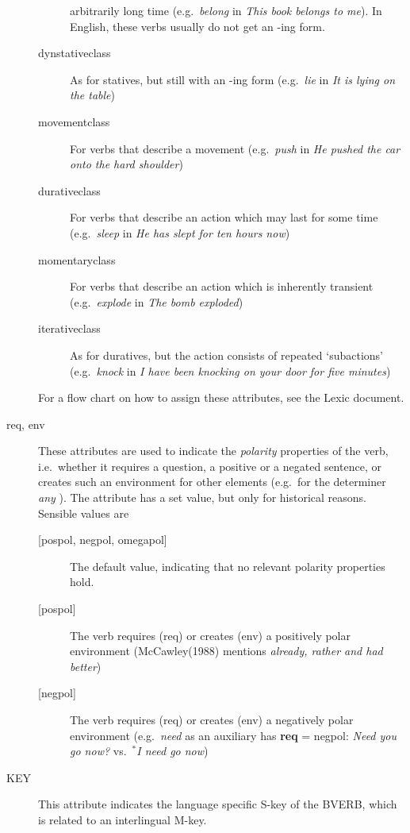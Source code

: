 \begin{description}
\begin{description}
arbitrarily long time (e.g.\ {\em belong\/} in {\em This book belongs to me\/}).
In English, these verbs usually do not get an -ing form.
  \item[dynstativeclass] As for statives, but still with an -ing form (e.g.\ 
{\em lie\/} in {\em It is lying on the table\/})
  \item[movementclass] For verbs that describe a movement (e.g.\ {\em push\/} 
in {\em He pushed the car onto the hard shoulder\/})
  \item[durativeclass] For verbs that describe an action which may last for 
some time (e.g.\ {\em sleep\/} in {\em He has slept for ten hours now\/})
  \item[momentaryclass] For verbs that describe an action which is inherently
transient (e.g.\ {\em explode\/} in {\em The bomb exploded\/})
  \item[iterativeclass] As for duratives, but the action consists of repeated 
`subactions' (e.g.\ {\em knock\/} in {\em I have been knocking on your door for 
five minutes\/})
  \end{description} 
For a flow chart on how to assign these attributes, see the Lexic document.

\item[req, env] These attributes are used to indicate the 
    {\em  polarity\/} properties of the verb, i.e.\ whether it requires a 
    question, a positive or a negated sentence, or creates
    such an environment for other elements (e.g.\ for the determiner {\em any\/
}).
    The attribute has a 
    set value, but only for historical reasons. Sensible values are
  \begin{description}
   \item[{[pospol, negpol, omegapol]}] The default value, indicating that no
     relevant polarity properties hold.
   \item[{[pospol]}] The verb requires (req) or creates (env) a positively polar
     environment (McCawley(1988) mentions {\em already, rather and had better})
   \item[{[negpol]}] The verb requires (req) or creates (env) a negatively polar
     environment (e.g.\ {\em need\/} as an auxiliary has {\bf req} = negpol: 
     {\em Need you go now?\/} vs.\ $^{*}${\em I need go now\/})
  \end{description}

\item[KEY] This attribute indicates the language specific S-key of the BVERB, 
which is related to an interlingual M-key.

\end{description}

